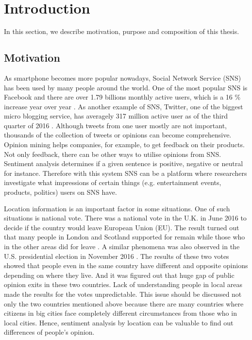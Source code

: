 \chapter{Introduction}
In this section, we describe motivation, purpose and composition of this thesis.

\section{Motivation} \label{sec:motivation}
As smartphone becomes more popular nowadays, Social Network Service (SNS) has been used by many people around the world.
One of the most popular SNS is Facebook and there are over 1.79 billions monthly active users, which is a 16 \% increase year over year \cite{facebook_user}.
As another example of SNS, Twitter, one of the biggest micro blogging service, has averagely 317 million active user as of the third quarter of 2016 \cite{twitter_user}.
Although tweets from one user mostly are not important, thousands of the collection of tweets or opinions can become comprehensive.
Opinion mining helps companies, for example, to get feedback on their products.
Not only feedback, there can be other ways to utilise opinions from SNS.
Sentiment analysis determines if a given sentence is positive, negative or neutral for instance.
Therefore with this system SNS can be a platform where researchers investigate what impressions of certain things (e.g. entertainment events, products, politics) users on SNS have.


Location information is an important factor in some situations.
One of such situations is national vote.
There was a national vote in the U.K. in June 2016 to decide if the country would leave European Union (EU).
The result turned out that many people in London and Scotland supported for remain while those who in the other areas did for leave \cite{uk_referendum}.
A similar phenomena was also observed in the U.S. presidential election in November 2016 \cite{us_map}.
The results of these two votes showed that people even in the same country have different and opposite opinions depending on where they live.
And it was figured out that huge gap of public opinion exits in these two countries.
Lack of understanding people in local areas made the results for the votes unpredictable.
This issue should be discussed not only the two countries mentioned above because there are many countries where citizens in big cities face completely different circumstances from those who in local cities.
Hence, sentiment analysis by location can be valuable to find out differences of people's opinion. 

